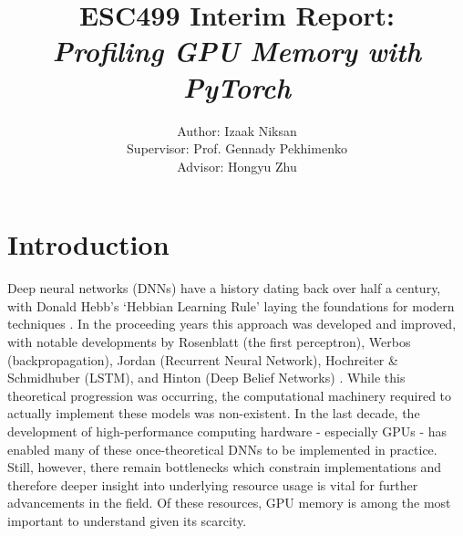 \documentclass[12pt,letterpaper]{article}
\begin{document}
\title{\textbf{ESC499 Interim Report:\\ \textit{Profiling GPU Memory with PyTorch}}}

\author{Author: Izaak Niksan\\
Supervisor: Prof. Gennady Pekhimenko\\
Advisor: Hongyu Zhu
}

\maketitle

\section{Introduction}
Deep neural networks (DNNs) have a history dating back over half a century, with Donald Hebb's \enquote*{Hebbian Learning Rule} laying the foundations for modern techniques \cite{dnn_history}. In the proceeding years this approach was developed and improved, with notable developments by Rosenblatt (the first perceptron), Werbos (backpropagation), Jordan (Recurrent Neural Network), Hochreiter \& Schmidhuber (LSTM), and Hinton (Deep Belief Networks) \cite{dnn_history}. While this theoretical progression was occurring, the computational machinery required to actually implement these models was non-existent. In the last decade, the development of high-performance computing hardware - especially GPUs - has enabled many of these once-theoretical DNNs to be implemented in practice. Still, however, there remain bottlenecks which constrain implementations and therefore deeper insight into underlying resource usage is vital for further advancements in the field. Of these resources, GPU memory is among the most important to understand given its scarcity. \par 
\end{document}
